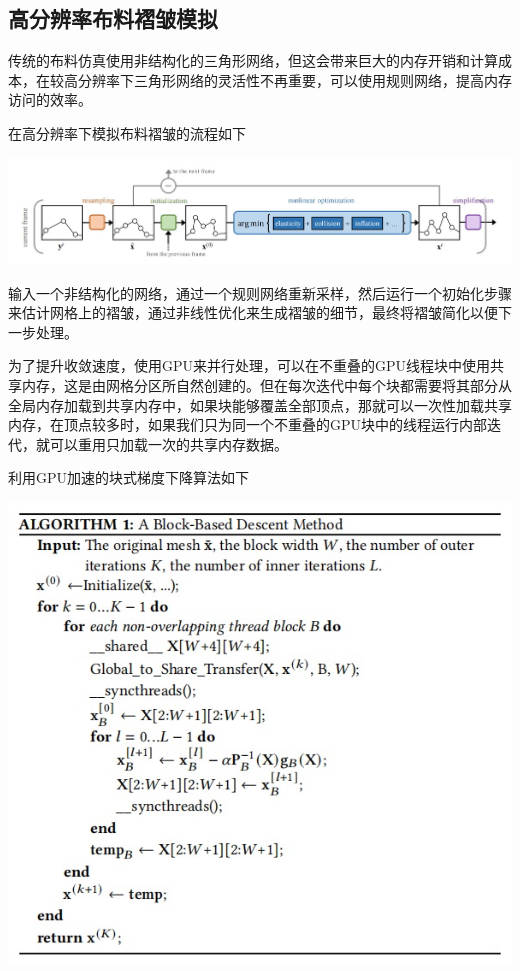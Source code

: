 \documentclass{CLGPY}
\begin{document}
\begin{multicols}{2}
		\section{高分辨率布料褶皱模拟\textsuperscript{\cite{9}}}
		传统的布料仿真使用非结构化的三角形网络，但这会带来巨大的内存开销和计算成本，在较高分辨率下三角形网络的灵活性不再重要，可以使用规则网络，提高内存访问的效率。

		在高分辨率下模拟布料褶皱的流程如下
        \begin{center}
            \includegraphics[width=1.0\linewidth]{./fig/褶皱模拟流程.jpg}
        \end{center}
		输入一个非结构化的网络，通过一个规则网络重新采样，然后运行一个初始化步骤来估计网格上的褶皱，通过非线性优化来生成褶皱的细节，最终将褶皱简化以便下一步处理。

		为了提升收敛速度，使用GPU来并行处理，可以在不重叠的GPU线程块中使用共享内存，这是由网格分区所自然创建的。但在每次迭代中每个块都需要将其部分从全局内存加载到共享内存中，如果块能够覆盖全部顶点，那就可以一次性加载共享内存，在顶点较多时，如果我们只为同一个不重叠的GPU块中的线程运行内部迭代，就可以重用只加载一次的共享内存数据。

		利用GPU加速的块式梯度下降算法如下
        \begin{center}
            \includegraphics[width=1.0\linewidth]{./fig/gpu.jpg}
        \end{center}


\end{multicols}
\end{document}
